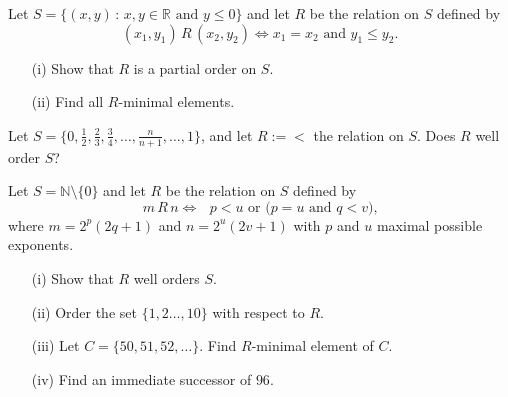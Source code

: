 \documentclass[11pt,paper=b5,footinclude,headinclude]{scrbook} %
\theoremstyle{remark}
\theoremstyle{definition} %
\theoremstyle{theorem} %
\newtheorem{ex}{Exercise\hypertarget{sol:\theex}}[chapter]
\begin{document}
\begin{ex}
    Let $S=\{ (x,y) \,:\, x, y\in\mathbb{R} \textrm{ and } y\leq 0 \}$  and let $R$ be the relation on $S$ defined by 
$$(x_1,y_1)\, R\, (x_2,y_2) \Leftrightarrow  x_1 = x_2 \textrm{ and } y_1\leq y_2.$$
\begin{enumerate}
\item[(i)] Show that $R$ is a partial order on $S$.
\item[(ii)] Find all $R$-minimal elements.
\end{enumerate}
\end{ex}

\begin{ex}
     Let  $S= \{0,\frac{1}{2}, \frac{2}{3}, \frac{3}{4}, \ldots, \frac{n}{n+1}, \ldots, 1\}$, and let $R:=<$ the relation on $S$. Does $R$ well order $S$?
\end{ex}
\begin{ex}
    Let $S = \mathbb{N}\setminus \{0\}$ and let  $R$ be the relation on $S$ defined by 
$$m\, R\, n \Leftrightarrow  \textrm{ $p< u$ or ($p=u$ and $q < v$),} $$
where $m=2^p(2q+1)$ and $n=2^u(2v+1)$ with $p$ and $u$ maximal possible exponents.
\begin{enumerate}
\item[(i)] Show that $R$ well orders $S$.
\item[(ii)] Order the set  $\{1,2\ldots, 10\}$ with respect to $R$.
\item[(iii)] Let $C= \{50, 51, 52, \ldots\}$. Find $R$-minimal element of $C$.
\item[(iv)] Find an immediate successor of $96$.
\end{enumerate}
\end{ex} 
\appendix
\end{document}
